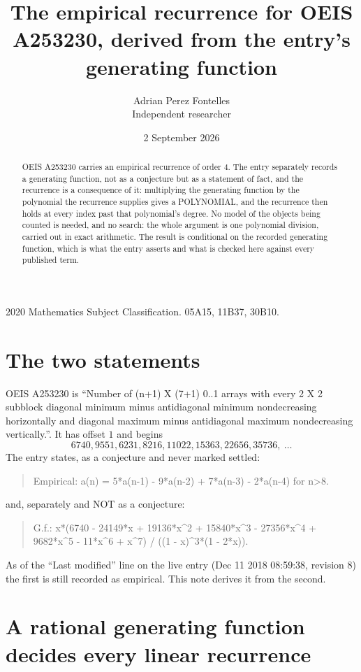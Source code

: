 \documentclass[11pt,a4paper]{article}
\title{The empirical recurrence for OEIS A253230, derived from the entry's generating function}
\author{Adrian Perez Fontelles\\ \small Independent researcher}
\date{2 September 2026}
\theoremstyle{plain}
\theoremstyle{definition}
\begin{document}
\maketitle

\begin{abstract}
OEIS A253230 carries an empirical recurrence of order $4$. The entry separately records a
generating function, not as a conjecture but as a statement of fact, and the recurrence is a
consequence of it: multiplying the generating function by the polynomial the recurrence
supplies gives a POLYNOMIAL, and the recurrence then holds at every index past that
polynomial's degree. No model of the objects being counted is needed, and no search: the
whole argument is one polynomial division, carried out in exact arithmetic. The result is
conditional on the recorded generating function, which is what the entry asserts and what is
checked here against every published term.
\end{abstract}

\noindent\small 2020 Mathematics Subject Classification. 05A15, 11B37, 30B10.\normalsize

\section{The two statements}

OEIS A253230 is ``Number of (n+1) X (7+1) 0..1 arrays with every 2 X 2 subblock diagonal minimum minus antidiagonal minimum nondecreasing horizontally and diagonal maximum minus antidiagonal maximum nondecreasing vertically.''. It has offset $1$ and begins
\[
6740, 9551, 6231, 8216, 11022, 15363, 22656, 35736,\ \dots
\]
The entry states, as a conjecture and never marked settled:
\begin{quote}
Empirical: a(n) = 5*a(n-1) - 9*a(n-2) + 7*a(n-3) - 2*a(n-4) for n>8.
\end{quote}
and, separately and NOT as a conjecture:
\begin{quote}
G.f.: x*(6740 - 24149*x + 19136*x\^{}2 + 15840*x\^{}3 - 27356*x\^{}4 + 9682*x\^{}5 - 11*x\^{}6 + x\^{}7) / ((1 - x)\^{}3*(1 - 2*x)).
\end{quote}
As of the ``Last modified'' line on the live entry (Dec 11 2018 08:59:38, revision 8) the first is still
recorded as empirical. This note derives it from the second.

\section{A rational generating function decides every linear recurrence}
\end{document}
